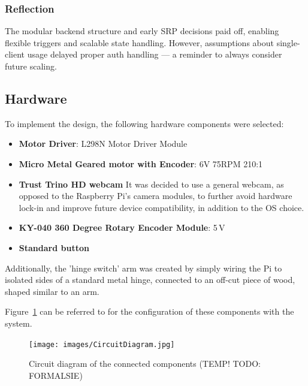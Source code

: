             \subsubsection*{Reflection}
                The modular backend structure and early SRP decisions paid off, enabling flexible triggers and scalable state handling. However, assumptions about single-client usage delayed proper auth handling — a reminder to always consider future scaling.
    
        \subsection{Hardware}
    
            To implement the design, the following hardware components were selected:
    
            \begin{itemize}
                \item \textbf{Motor Driver}: L298N Motor Driver Module
                \item \textbf{Micro Metal Geared motor with Encoder}: 6V 75RPM 210:1
                \item \textbf{Trust Trino HD webcam} It was decided to use a general webcam, as opposed to the Raspberry Pi's camera modules, to further avoid hardware lock-in and improve future device compatibility, in addition to the OS choice.
                \item \textbf{KY-040 360 Degree Rotary Encoder Module}: 5\,V
                \item \textbf{Standard button}
            \end{itemize}
    
            Additionally, the 'hinge switch' arm was created by simply wiring the Pi to isolated sides of a standard metal hinge, connected to an off-cut piece of wood, shaped similar to an arm.
    
            Figure~\ref{fig:circuitDiagram} can be referred to for the configuration of these components with the system.
    
            \begin{figure}
                \centering
                \texttt{[image: images/CircuitDiagram.jpg]}
                \caption{Circuit diagram of the connected components (TEMP! TODO: FORMALSIE)}
                \label{fig:circuitDiagram}
            \end{figure}
        
